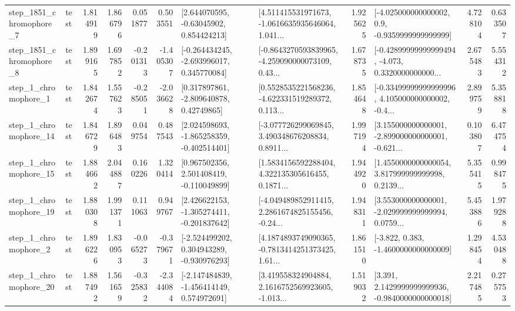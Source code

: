 \begin{tabular}{llrrrrllrlrr}
  step\_1851\_chromophore\_7 &      test &      1.814919 &    1.866796 &      0.051877 &  0.503551 &     [2.644070595, -0.63045902, 0.854424213] &  [4.511415531971673, -1.0616635935646064, 1.041... &       1.925625 &     [-4.025000000000002, 0.9, -0.9359999999999999] &            4.728104 &          0.633507 \\
  step\_1851\_chromophore\_8 &      test &      1.899165 &    1.697852 &     -0.201313 & -1.405307 &   [-0.264434245, -2.693996017, 0.345770084] &  [-0.8643270593839965, -4.259090000073109, 0.43... &       1.678735 &  [-0.42899999999999494, -4.073, 0.3320000000000... &            2.675483 &          5.554312 \\
     step\_1\_chromophore\_1 &      test &      1.842674 &    1.557623 &     -0.285051 & -2.036628 &     [0.317897861, -2.809640878, 0.42749865] &  [0.5528535221568236, -4.622331519289372, 0.113... &       1.854648 &  [-0.33499999999999996, 4.105000000000002, -0.4... &            2.899759 &          5.358818 \\
    step\_1\_chromophore\_14 &      test &      1.846729 &    1.896483 &      0.049754 &  0.487543 &   [2.024598693, -1.865258359, -0.402514401] &  [-3.077726299069845, 3.490348676208834, 0.8911... &       1.997194 &  [3.155000000000001, -2.899000000000001, -0.621... &            0.103807 &          6.474754 \\
    step\_1\_chromophore\_15 &      test &      1.884662 &    2.044887 &      0.160226 &  1.320414 &    [0.967502356, 2.501408419, -0.110049899] &  [1.5834156592288404, 4.322135305616455, 0.1871... &       1.944920 &  [1.4550000000000054, 3.817999999999998, 0.2139... &            5.355415 &          0.998475 \\
    step\_1\_chromophore\_19 &      test &      1.880308 &    1.991371 &      0.111063 &  0.949767 &   [2.426622153, -1.305274411, -0.201837642] &  [-4.049489852911415, 2.2861674825155456, -0.24... &       1.948311 &  [3.553000000000001, -2.029999999999994, 0.0759... &            5.453886 &          1.979288 \\
     step\_1\_chromophore\_2 &      test &      1.896226 &    1.830953 &     -0.065273 & -0.379671 &   [-2.524499202, 0.304943289, -0.930976293] &  [4.1874893749090365, -0.7813414251373425, 1.61... &       1.861510 &               [-3.822, 0.383, -1.4600000000000009] &            1.298454 &          4.530488 \\
    step\_1\_chromophore\_20 &      test &      1.887492 &    1.561659 &     -0.325832 & -2.344084 &   [-2.147484839, -1.456414149, 0.574972691] &  [3.419558324904884, 2.1616752569923605, -1.013... &       1.519032 &   [3.391, 2.1429999999999936, -0.9840000000000018] &            2.217485 &          0.275753 \\

\end{tabular}
